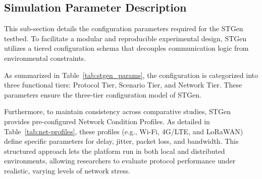 \documentclass[jsan,article,submit,moreauthors,pdftex]{Definitions/mdpi}
\begin{document}
\subsection{Simulation Parameter Description} 
This sub-section details the configuration parameters required for the STGen testbed. To facilitate a modular and reproducible experimental design, STGen utilizes a tiered configuration schema that decouples communication logic from environmental constraints.

As summarized in Table~\ref{tab:stgen_params}, the configuration is categorized into three functional tiers: Protocol Tier, Scenario Tier, and Network Tier. These parameters ensure the three-tier configuration model of STGen.   

Furthermore, to maintain consistency across comparative studies, STGen provides pre-configured Network Condition Profiles. As detailed in Table~\ref{tab:net-profiles}, these profiles (e.g., Wi-Fi, 4G/LTE, and LoRaWAN) define specific parameters for delay, jitter, packet loss, and bandwidth. This structured approach lets the platform run in both local and distributed environments, allowing researchers to evaluate protocol performance under realistic, varying levels of network stress.
\end{document}
